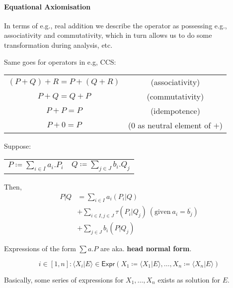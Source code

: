 \documentclass[99-notes-packed.tex]{subfiles}
\begin{document}
\paragraph*{Equational Axiomisation}
In terms of e.g., real addition we describe the operator as possessing e.g., associativity and commutativity, which in turn allows us to do some transformation during analysis, etc. 

Same goes for operators in e.g, CCS: 
\begin{center}
    \begin{tabular}{cc}
        $(P + Q) + R = P + (Q + R)$ & (associativity) \\
        $P + Q = Q + P$ & (commutativity) \\
        $P + P = P$ & (idempotence) \\
        $P + 0 = P$ & ($0$ as neutral element of $+$)
    \end{tabular}
\end{center}

\begin{definition}
    Suppose: 
    \begin{center}
        \begin{tabular}{cc}
            $P \coloneqq \sum_{i \in I} a_i.P_i$ &
            $Q \coloneqq \sum_{j \in J} b_i.Q_j$
        \end{tabular}
    \end{center}

    Then, 
    \begin{align*}
        P | Q &= \sum_{i \in I} a_i(P_i | Q) \\
              &+ \sum_{i \in I, j \in J} \tau(P_i | Q_j)\ (\mathrm{given\ }a_i = \overline{b_j}) \\
              &+ \sum_{j \in J} b_i(P | Q_j)
    \end{align*}

    Expressions of the form $\sum a.P$ are aka. \textbf{head normal form}.
\end{definition}

\begin{definition}
    \begin{equation*}
        i \in [1, n]: \langle X_i | E \rangle \in \mathsf{Expr}(X_1 \coloneqq \langle X_1 | E \rangle, \dots, X_n \coloneqq \langle X_n | E \rangle)
    \end{equation*}

    Basically, some series of expressions for $X_1, \dots, X_n$ exists as solution for $E$. 
\end{definition}
\end{document}
